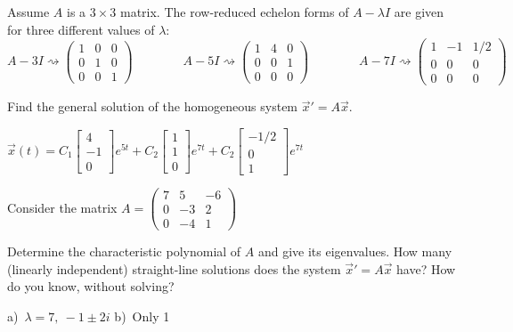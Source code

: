 \begin{exercise}
Assume $A$ is a $3\times 3$ matrix. The row-reduced echelon forms of $A-\lambda I$ are given for three different values of $\lambda$:
$$A-3I \rightsquigarrow \begin{pmatrix} 1&0&0\\ 0&1&0\\ 0&0&1 \end{pmatrix} \qquad\qquad 
A-5I \rightsquigarrow \begin{pmatrix} 1&4&0\\ 0&0&1\\ 0&0&0 \end{pmatrix}\qquad\qquad
A-7I \rightsquigarrow \begin{pmatrix} 1&-1&1/2\\ 0&0&0\\ 0&0&0 \end{pmatrix}$$

Find the general solution of the homogeneous system $\vec{x}'=A\vec{x}$.
\end{exercise}
\comboSol{%
}
{%
$\vec{x}(t) = C_1\left[\begin{smallmatrix} 4 \\ -1 \\ 0 \end{smallmatrix}\right]e^{5t} + C_2\left[\begin{smallmatrix} 1 \\ 1 \\ 0 \end{smallmatrix}\right]e^{7t} + C_2\left[\begin{smallmatrix} -1/2 \\ 0 \\ 1 \end{smallmatrix}\right]e^{7t}$
}

\begin{exercise}
Consider the matrix
$A=\displaystyle \begin{pmatrix} 
7 & 5 & -6 \\
0 & -3 & 2 \\
0  & -4 & 1 \end{pmatrix}$
\begin{tasks}
\task Determine the characteristic polynomial of $A$ and give its eigenvalues.
\task How many (linearly independent) straight-line solutions does the system ${\vec{x}}'=A\vec{x}$ have? How do you know, without solving? 
\end{tasks}
\end{exercise}
\comboSol{%
}
{%
a)~$\lambda = 7,\ -1\pm 2i$ \quad b)~Only 1
}

